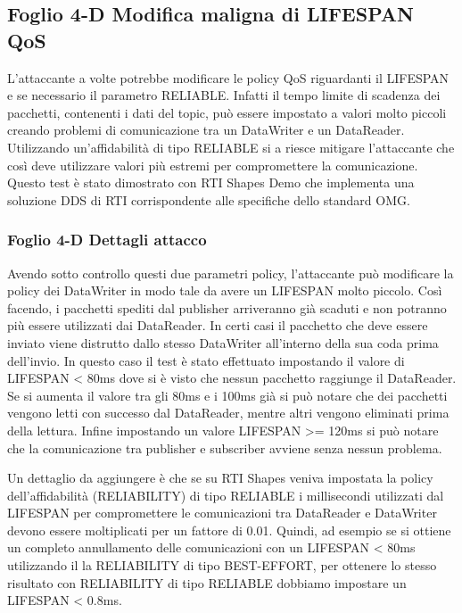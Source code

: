 \subsection{Foglio 4-D Modifica maligna di LIFESPAN QoS}
L'attaccante a volte potrebbe modificare le policy QoS riguardanti il
LIFESPAN e se necessario il parametro RELIABLE.
Infatti il tempo limite di scadenza dei pacchetti, contenenti i dati del topic,
può essere impostato a valori molto piccoli creando problemi di comunicazione
tra un DataWriter e un DataReader. Utilizzando un'affidabilità di tipo RELIABLE
si a riesce mitigare l'attaccante che così deve utilizzare valori più estremi
per compromettere
la comunicazione. Questo test è stato dimostrato con RTI Shapes Demo che 
implementa una
soluzione DDS di RTI corrispondente alle specifiche dello standard OMG.
\cite{DBLP:conf/malware/MichaudDL18}


\subsubsection{Foglio 4-D Dettagli attacco}
Avendo sotto controllo questi due parametri policy, l'attaccante può modificare la
policy dei DataWriter in modo tale da avere un LIFESPAN molto piccolo. Così
facendo, i pacchetti spediti dal publisher arriveranno già scaduti e non potranno più
essere utilizzati dai DataReader. In certi casi il pacchetto che deve essere inviato
viene distrutto dallo stesso DataWriter all'interno della sua coda prima dell'invio. 
In questo caso il test è stato effettuato impostando il valore di
LIFESPAN < 80ms dove si è visto che nessun pacchetto raggiunge il DataReader.
Se si aumenta il valore tra gli 80ms e i 100ms già si può notare che dei pacchetti
vengono letti con successo dal DataReader, mentre altri vengono eliminati prima
della lettura. Infine impostando un valore LIFESPAN >= 120ms si può notare che
la comunicazione tra publisher e subscriber avviene senza nessun problema.


Un dettaglio da aggiungere è che se su RTI Shapes veniva impostata la policy
dell'affidabilità (RELIABILITY) di tipo RELIABLE i millisecondi utilizzati
dal LIFESPAN per compromettere le comunicazioni tra DataReader e DataWriter
devono essere moltiplicati per un fattore di 0.01. Quindi, ad esempio se si
ottiene un completo annullamento delle comunicazioni con un LIFESPAN < 80ms
utilizzando il la RELIABILITY di tipo BEST-EFFORT, per ottenere lo stesso
risultato con RELIABILITY di tipo RELIABLE dobbiamo impostare un
LIFESPAN < 0.8ms.
\cite{DBLP:conf/malware/MichaudDL18}

